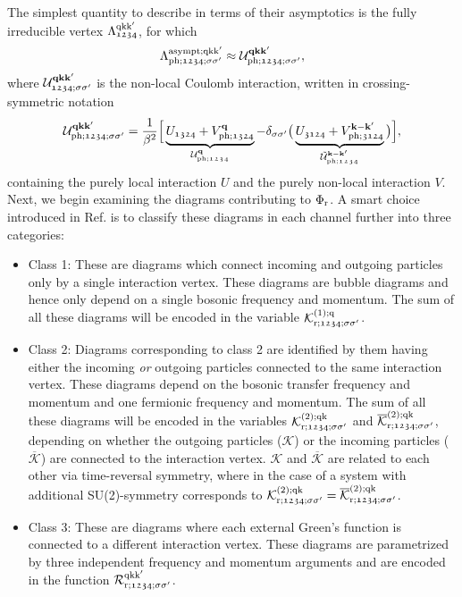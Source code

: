 \documentclass[../../main.tex]{subfiles}
\begin{document}
The simplest quantity to describe in terms of their asymptotics is the fully irreducible vertex $\Lambda^{\text{q}\text{k}\text{k}'}_{\mathfrak{1234}}$, for which
\begin{align}
	\Lambda^{\text{asympt};\text{q}\text{k}\text{k}'}_{\text{ph};\mathfrak{1234};\sigma\sigma'}\approx\mathcal{U}^{\textbf{qkk}'}_{\text{ph};\mathfrak{1234};\sigma\sigma'},
\end{align}
where $\mathcal{U}^{\textbf{qkk}'}_{\mathfrak{1234};\sigma\sigma'}$ is the non-local Coulomb interaction, written in crossing-symmetric notation
\begin{align}\label{eq:crossing_symmetric_uq}
	 \mathcal{U}^{\textbf{qkk}'}_{\text{ph};\mathfrak{1234};\sigma\sigma'}= \frac{1}{\beta^2}\Big [ \underbrace{U_{\mathfrak{1324}}+V^{\textbf{q}}_{\text{ph};\mathfrak{1324}}}_{\mathcal{U}^{\textbf{q}}_{\text{ph};\mathfrak{1234}}}-\delta_{\sigma\sigma'}\big (\underbrace{U_{\mathfrak{3124}}+V^{\textbf{k}-\textbf{k}'}_{\text{ph};\mathfrak{3124}}}_{\tilde{\mathcal{U}}^{\textbf{k}-\textbf{k}'}_{\text{ph};\mathfrak{1234}}}\big )\Big ],
\end{align}
containing the purely local interaction $U$ and the purely non-local interaction $V$. Next, we begin examining the diagrams contributing to $\Phi_{\text{r}}$. A smart choice introduced in Ref. \cite{high-freq asympt} is to classify these diagrams in each channel further into three categories:
\begin{itemize}
	\item Class 1: These are diagrams which connect incoming and outgoing particles only by a single interaction vertex. These diagrams are bubble diagrams and hence only depend on a single bosonic frequency and momentum. The sum of all these diagrams will be encoded in the variable $\mathcal{K}^{(1);\text{q}}_{\text{r};\mathfrak{1234};\sigma\sigma'}$.
	\item Class 2: Diagrams corresponding to class 2 are identified by them having either the incoming \textit{or} outgoing particles connected to the same interaction vertex. These diagrams depend on the bosonic transfer frequency and momentum and one fermionic frequency and momentum. The sum of all these diagrams will be encoded in the variables $\mathcal{K}^{(2);\text{q}\text{k}}_{\text{r};\mathfrak{1234};\sigma\sigma'}$ and $\overline{\mathcal{K}}^{(2);\text{q}\text{k}}_{\text{r};\mathfrak{1234};\sigma\sigma'}$, depending on whether the outgoing particles ($\mathcal{K}$) or the incoming particles ($\overline{\mathcal{K}}$) are connected to the interaction vertex. $\mathcal{K}$ and $\overline{\mathcal{K}}$ are related to each other via time-reversal symmetry, where in the case of a system with additional SU(2)-symmetry corresponds to \cite{rohringer thesis} $\mathcal{K}^{(2);\text{q}\text{k}}_{\text{r};\mathfrak{1234};\sigma\sigma'}=\overline{\mathcal{K}}^{(2);\text{q}\text{k}}_{\text{r};\mathfrak{1234};\sigma\sigma'}$.
	\item Class 3: These are diagrams where each external Green's function is connected to a different interaction vertex. These diagrams are parametrized by three independent frequency and momentum arguments and are encoded in the  function $\mathcal{R}^{\text{q}\text{k}\text{k}'}_{\text{r};\mathfrak{1234};\sigma\sigma'}$.
\end{itemize}
\end{document}
